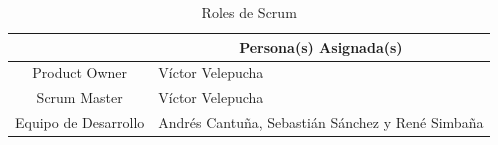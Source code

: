 \begin{table}[H]
    \centering
    \caption{Roles de Scrum}
    \label{tab:rolesProyecto}
    \begin{tabular}{|c|m{}|}
    \hline
    \rowcolor{gray!50}
    \multicolumn{1}{|c|}{\textbf{Rol}} & \multicolumn{1}{c|}{\textbf{Persona(s) Asignada(s)}} \\
    \hline
    Product Owner & Víctor Velepucha \\
    \hline
    Scrum Master & Víctor Velepucha \\
    \hline
    Equipo de Desarrollo & Andrés Cantuña, Sebastián Sánchez y René Simbaña \\
    \hline
    \end{tabular}
\end{table}